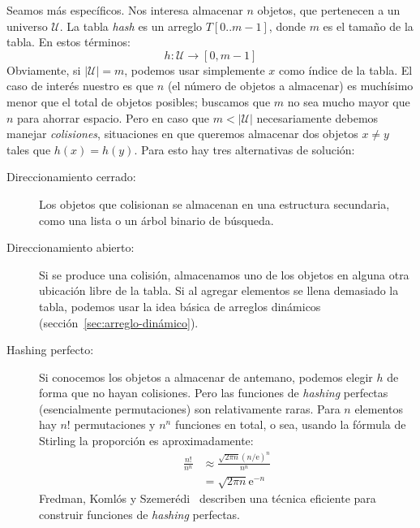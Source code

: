   Seamos más específicos.
  Nos interesa almacenar \(n\) objetos,
  que pertenecen a un universo \(\mathscr{U}\).
  La tabla \emph{\foreignlanguage{english}{hash}}
  es un arreglo \(T[0..m - 1]\),
  donde \(m\) es el tamaño de la tabla.
  En estos términos:
  \begin{equation*}
    h \colon \mathscr{U} \to [0, m - 1]
  \end{equation*}
  Obviamente,
  si \(\lvert \mathscr{U} \rvert = m\),
  podemos usar simplemente \(x\) como índice de la tabla.
  El caso de interés nuestro es que \(n\)
  (el número de objetos a almacenar)
  es muchísimo menor que el total de objetos posibles;
  buscamos que \(m\) no sea mucho mayor que \(n\) para ahorrar espacio.
  Pero en caso que \(m < \lvert \mathscr{U} \rvert\)
  necesariamente debemos manejar \emph{colisiones},
  situaciones en que queremos almacenar dos objetos \(x \ne y\)
  tales que \(h(x) = h(y)\).
  Para esto hay tres alternativas de solución:
  \begin{description}
  \item[Direccionamiento cerrado:]
    Los objetos que colisionan se almacenan en una estructura secundaria,
    como una lista o un árbol binario de búsqueda.
  \item[Direccionamiento abierto:]
    Si se produce una colisión,
    almacenamos uno de los objetos en alguna otra ubicación libre de la tabla.
    Si al agregar elementos se llena demasiado la tabla,
    podemos usar la idea básica de arreglos dinámicos
    (sección~\ref{sec:arreglo-dinámico}).
  \item[Hashing perfecto:]
    Si conocemos los objetos a almacenar de antemano,
    podemos elegir \(h\) de forma que no hayan colisiones.
    Pero las funciones de \emph{\foreignlanguage{english}{hashing}} perfectas
    (esencialmente permutaciones)
    son relativamente raras.
    Para \(n\) elementos hay \(n!\) permutaciones y \(n^n\) funciones en total,
    o sea,
    usando la fórmula de Stirling
    la proporción es aproximadamente:
    \begin{align}
      \frac{n!}{n^n}
        &\approx \frac{\sqrt{2 \pi n} (n / \mathrm{e})^n}{n^n} \\
        &=	 \sqrt{2 \pi n} \mathrm{e}^{-n}
                      \label{eq:fraction.perfect}
    \end{align}
    Fredman, Komlós y Szemerédi~%
      \cite{fredman84:_perfect_hashing}
    describen una técnica eficiente
    para construir funciones
    de \emph{\foreignlanguage{english}{hashing}} perfectas.
  \end{description}

